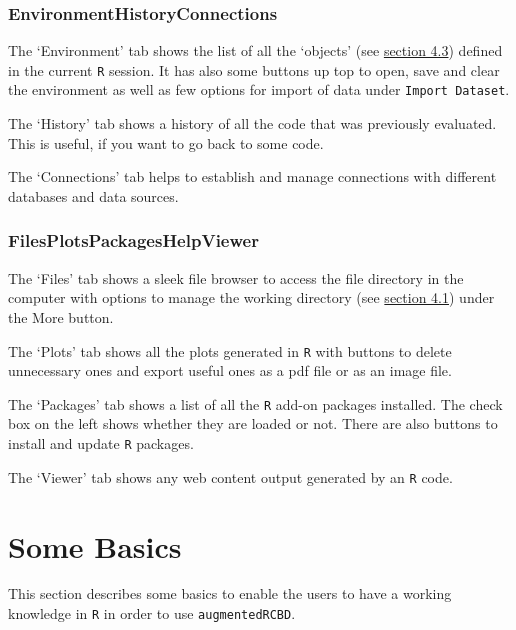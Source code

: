 \hypertarget{environmenthistoryconnections}{%
\subsubsection{Environment\textbar{}History\textbar{}Connections}\label{environmenthistoryconnections}}

The `Environment' tab shows the list of all the `objects' (see
\protect\hyperlink{ObjFun}{section 4.3}) defined in the current
\texttt{R} session. It has also some buttons up top to open, save and
clear the environment as well as few options for import of data under
\texttt{Import\ Dataset}.

The `History' tab shows a history of all the code that was previously
evaluated. This is useful, if you want to go back to some code.

The `Connections' tab helps to establish and manage connections with
different databases and data sources.

\hypertarget{filesplotspackageshelpviewer}{%
\subsubsection{Files\textbar{}Plots\textbar{}Packages\textbar{}Help\textbar{}Viewer}\label{filesplotspackageshelpviewer}}

The `Files' tab shows a sleek file browser to access the file directory
in the computer with options to manage the working directory (see
\protect\hyperlink{wdir}{section 4.1}) under the More button.

The `Plots' tab shows all the plots generated in \texttt{R} with buttons
to delete unnecessary ones and export useful ones as a pdf file or as an
image file.

The `Packages' tab shows a list of all the \texttt{R} add-on packages
installed. The check box on the left shows whether they are loaded or
not. There are also buttons to install and update \texttt{R} packages.

The `Viewer' tab shows any web content output generated by an \texttt{R}
code.

\hypertarget{some-basics}{%
\section{Some Basics}\label{some-basics}}

This section describes some basics to enable the users to have a working
knowledge in \texttt{R} in order to use \texttt{augmentedRCBD}.

